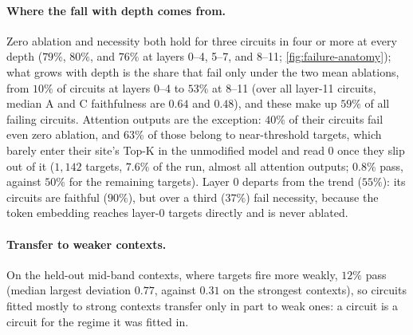 \documentclass[10pt]{article}
\begin{document}
\paragraph{Where the fall with depth comes from.}
Zero ablation and necessity both hold for three circuits in four or more at every depth ($79\%$, $80\%$, and $76\%$ at layers 0--4, 5--7, and 8--11; \cref{fig:failure-anatomy}); what grows with depth is the share that fail only under the two mean ablations, from $10\%$ of circuits at layers 0--4 to $53\%$ at 8--11 (over all layer-11 circuits, median A and C faithfulness are $0.64$ and $0.48$), and these make up $59\%$ of all failing circuits.
Attention outputs are the exception: $40\%$ of their circuits fail even zero ablation, and $63\%$ of those belong to near-threshold targets, which barely enter their site's Top-K in the unmodified model and read $0$ once they slip out of it ($1{,}142$ targets, $7.6\%$ of the run, almost all attention outputs; $0.8\%$ pass, against $50\%$ for the remaining targets).
Layer 0 departs from the trend ($55\%$): its circuits are faithful ($90\%$), but over a third ($37\%$) fail necessity, because the token embedding reaches layer-0 targets directly and is never ablated.

\paragraph{Transfer to weaker contexts.}
On the held-out mid-band contexts, where targets fire more weakly, $12\%$ pass (median largest deviation $0.77$, against $0.31$ on the strongest contexts), so circuits fitted mostly to strong contexts transfer only in part to weak ones: a circuit is a circuit for the regime it was fitted in.
\end{document}
